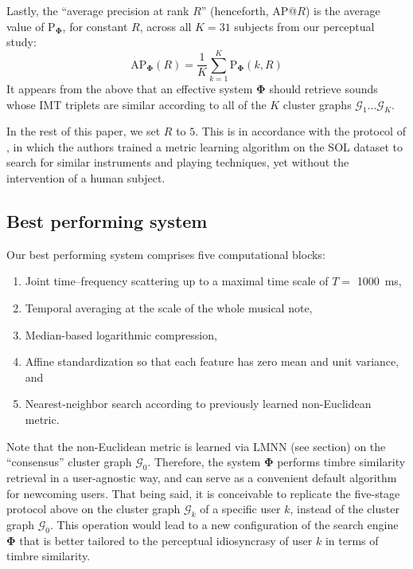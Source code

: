 \documentclass{bmcart}
\newcommand{\lnameref}[1]{%
\bgroup
\let\nmu\MakeLowercase
\nameref{#1}\egroup}
\newcommand{\nmu}{}
\begin{document}
Lastly, the ``average precision at rank $R$'' (henceforth, AP@$R$) is the average value of $\mathrm{P}_{\mathbf{\Phi}}$, for constant $R$, across all $K=31$ subjects from our perceptual study:
\begin{equation}
\mathrm{AP}_{\mathbf{\Phi}}(R) =
\dfrac{1}{K}
\sum_{k=1}^{K}
\mathrm{P}_{\mathbf{\Phi}}(k, R)
\end{equation}
It appears from the above that an effective system $\mathbf{\Phi}$ should retrieve sounds whose IMT triplets are similar according to all of the $K$ cluster graphs $\mathcal{G}_1 \ldots \mathcal{G}_K$.

In the rest of this paper, we set $R$ to $5$.
This is in accordance with the protocol of \cite{lostanlen2018extended}, in which the authors trained a metric learning algorithm on the SOL dataset to search for similar instruments and playing techniques, yet without the intervention of a human subject.


\subsection*{Best performing system}
Our best performing system comprises five computational blocks:

\begin{enumerate}
\item Joint time--frequency scattering up to a maximal time scale of $T=$ \SI{1000}{\milli\second},
\item Temporal averaging at the scale of the whole musical note,
\item Median-based logarithmic compression,
\item Affine standardization so that each feature has zero mean and unit variance, and
\item Nearest-neighbor search according to previously learned non-Euclidean metric.
\end{enumerate}

Note that the non-Euclidean metric is learned via LMNN (see \lnameref{sec:methods} section) on the ``consensus'' cluster graph $\mathcal{G}_0$.
Therefore, the system $\mathbf{\Phi}$ performs timbre similarity retrieval in a user-agnostic way, and can serve as a convenient default algorithm for newcoming users.
That being said, it is conceivable to replicate the five-stage protocol above on the cluster graph $\mathcal{G}_k$ of a specific user $k$, instead of the cluster graph $\mathcal{G}_0$.
This operation would lead to a new configuration of the search engine $\mathbf{\Phi}$ that is better tailored to the perceptual idiosyncrasy of user $k$ in terms of timbre similarity.
\end{document}
